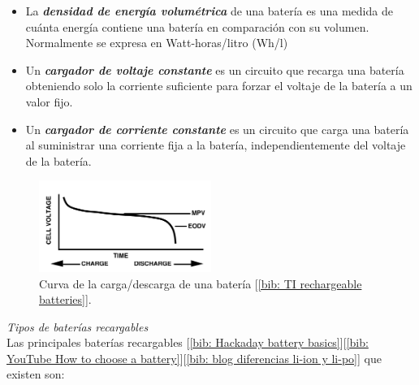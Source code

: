 \documentclass[12pt]{article}
\begin{document}
\begin{itemize}
 		\item La \textit{\textbf{densidad de energía volumétrica}} de una batería es una medida de cuánta energía contiene una batería en comparación con su volumen. Normalmente se expresa en Watt-horas/litro (Wh/l)
 		\item Un \textit{\textbf{cargador de voltaje constante}} es un circuito que recarga una batería obteniendo solo la corriente suficiente para forzar el voltaje de la batería a un valor fijo.
 		\item Un \textit{\textbf{cargador de corriente constante}} es un circuito que carga una batería al suministrar una corriente fija a la batería, independientemente del voltaje de la batería.
	\end{itemize}

	
	\begin{figure}[h!]
		\begin{center}
			\includegraphics[width=0.5\textwidth]{img/chargeDischargeCurve_TxInst.png}
			\caption{Curva de la carga/descarga de una batería [\ref{bib: TI rechargeable batteries}].}
		\end{center}
	\end{figure}

	\pagebreak

	
	\noindent \textit{Tipos de baterías recargables}\\
	
	\noindent Las principales baterías recargables [\ref{bib: Hackaday battery basics}][\ref{bib: YouTube How to choose  a battery}][\ref{bib: blog diferencias li-ion y li-po}] que existen son: \\
	
\end{document}

